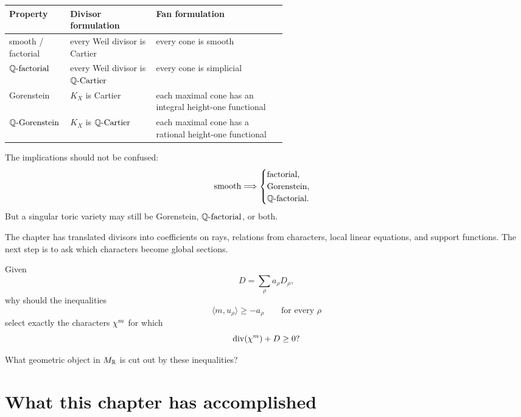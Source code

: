\begin{center}
\small
\renewcommand{\arraystretch}{1.3}
\begin{tabularx}{\linewidth}{@{}
  >{\raggedright\arraybackslash}p{0.22\linewidth}
  >{\raggedright\arraybackslash}p{0.31\linewidth}
  >{\raggedright\arraybackslash}X@{}}
\toprule
\textbf{Property}
&
\textbf{Divisor formulation}
&
\textbf{Fan formulation}
\\
\midrule
smooth / factorial
&
every Weil divisor is Cartier
&
every cone is smooth
\\
\(\mathbb{Q}\text{-factorial}\)
&
every Weil divisor is \(\mathbb{Q}\text{-Cartier}\)
&
every cone is simplicial
\\
Gorenstein
&
\(K_X\) is Cartier
&
each maximal cone has an integral height-one functional
\\
\(\mathbb{Q}\text{-Gorenstein}\)
&
\(K_X\) is \(\mathbb{Q}\text{-Cartier}\)
&
each maximal cone has a rational height-one functional
\\
\bottomrule
\end{tabularx}
\end{center}

The implications should not be confused:
\[
\text{smooth}
\Longrightarrow
\begin{cases}
\text{factorial},\\
\text{Gorenstein},\\
\mathbb{Q}\text{-factorial}.
\end{cases}
\]
But a singular toric variety may still be Gorenstein, \(\mathbb{Q}\text{-factorial}\),
or both.

The chapter has translated divisors into coefficients on rays,
relations from characters, local linear equations, and support
functions. The next step is to ask which characters become global
sections.

\begin{guidingquestion}
Given
\[
D=\sum_\rho a_\rho D_\rho,
\]
why should the inequalities
\[
\langle m,u_\rho\rangle\geq-a_\rho
\qquad
\text{for every }\rho
\]
select exactly the characters \(\chi^{m}\) for which
\[
\operatorname{div}(\chi^{m})+D\geq0?
\]

What geometric object in \(M_{\mathbb{R}}\) is cut out by these inequalities?
\end{guidingquestion}

\clearpage
\section*{What this chapter has accomplished}

